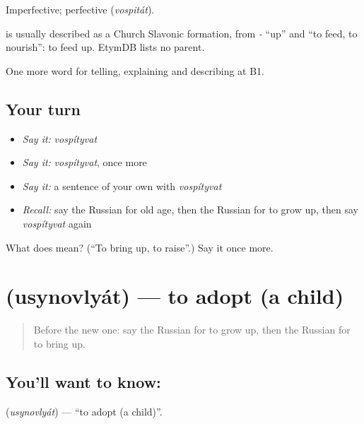 Imperfective; perfective \emph{} (\emph{vospitát}).

\begin{cousinweb}
\emph{} is usually described as a Church Slavonic formation, from \emph{-} \textquotedblleft{}up\textquotedblright{} and \emph{} \textquotedblleft{}to feed, to nourish\textquotedblright{}: to feed up. EtymDB lists no parent.
\end{cousinweb}

\begin{grammarlens}[title={What you've built}]
One more word for telling, explaining and describing at B1.
\end{grammarlens}

\subsection*{Your turn}
\begin{itemize}
\raggedright
  \item \emph{Say it:} \emph{vospítyvat}
  \item \emph{Say it:} \emph{vospítyvat}, once more
  \item \emph{Say it:} a sentence of your own with \emph{vospítyvat}
  \item \emph{Recall:} say the Russian for old age, then the Russian for to grow up, then say \emph{vospítyvat} again
\end{itemize}

\begin{tcolorbox}[breakable,colback=teal!4,colframe=teal!35!black,title={Before you move on}]
What does  mean? (\textquotedblleft{}To bring up, to raise\textquotedblright{}.) Say it once more.
\end{tcolorbox}
\section[\texorpdfstring{\ru{усыновлять} (usynovlyát)}{усыновлять (usynovlyát)}]{ (usynovlyát) — to adopt (a child)}

\label{lesson:RU-C305-usynovlyat}



\begin{quote}
Before the new one: say the Russian for to grow up, then the Russian for to bring up.
\end{quote}

\subsection*{You'll want to know: }
\textbf{} (\emph{usynovlyát}) — \textquotedblleft{}to adopt (a child)\textquotedblright{}.

